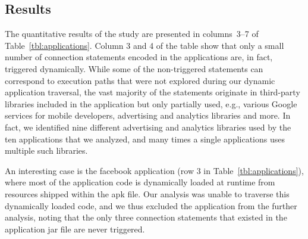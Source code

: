 \vspace{-0.05in}
\subsection{Results}
The quantitative results of the study are presented in columns~3--7 of Table~\ref{tbl:applications}. 
Column 3 and 4 of the table show that only a small number of connection statements encoded in the applications are, in fact, triggered dynamically. 
While some of the non-triggered statements can correspond to execution paths that were not explored during our dynamic application traversal, the vast majority of the statements originate in  
third-party libraries included in the application but only partially used, e.g., various Google services for mobile developers, advertising and analytics libraries and more.
In fact, we identified nine different advertising and analytics libraries used by the ten applications that we analyzed, 
and many times a single applications uses multiple such libraries.

An interesting case is the facebook application (row 3 in Table~\ref{tbl:applications}), where most of the application code is dynamically loaded at runtime from resources shipped within the apk file. 
Our analysis was unable to traverse this dynamically loaded code, and we thus excluded the application from the further analysis, noting that the only three connection statements that existed in the application jar file are never triggered. 

\begin{table}[t]
\caption{Communication Types.}
\label{tbl:statementTypes}
\centering
\end{table}


